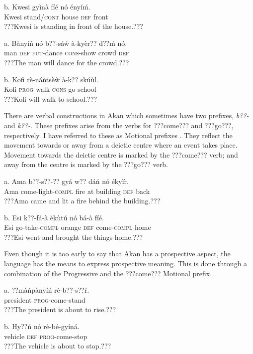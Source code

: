 \documentclass[output=paper]{langsci/langscibook}
\begin{document}
\ea
\gll b.  Kwesi  gyìnà    fíé  nó  ényíḿ.\\
       Kwesi  stand/\textsc{cont}  house  \textsc{def}  front\\
\glt ???Kwesi is standing in front of the house.???
\z

\ea
\gll a.  Bànyíń  nó  b??-sá\'{w}   à-kyèr??    d??ḿ  nó.\\
       man  \textsc{def}  \textsc{fut}{}-dance  \textsc{cons}{}-show  crowd  \textsc{def}\\
\glt   ???The man will dance for the crowd.???
\z

\ea
\gll   b.  Kofi  rè-náńtsèẁ  à-k??    skú\`{u}l.\\
       Kofi  \textsc{prog}{}-walk  \textsc{cons}{}-go  school\\
\glt   ???Kofi will walk to school.???
\z

There are verbal constructions in Akan which sometimes have two prefixes, \emph{b??-} and \emph{k??-}. These prefixes arise from the verbs for ???come??? and ???go???, respectively. I have referred to these as Motional prefixes \citep{Osam2002}. They reflect the movement towards or away from a deictic centre where an event takes place. Movement towards the deictic centre is marked by the ???come??? verb; and away from the centre is marked by the ???go??? verb. 

\ea
\gll a.  Ama  b??-s??-??      gyá  w??  dáń    nó  ékyì\`{r}.\\
       Ama  come-light-\textsc{compl}  fire  at  building  \textsc{def}  back\\
\glt   ???Ama came and lit a fire behind the building.???
\z

\ea
\gll  b.  Esi  k??-fá-à      èk\`{u}tú    nó  bá-à    fíé.\\
       Esi  go-take-\textsc{compl}  orange    \textsc{def}  come-\textsc{compl}  home\\
\glt   ???Esi went and brought the things home.???
\z

Even though it is too early to say that Akan has a prospective aspect, the language has the means to express prospective meaning. This is done through a combination of the Progressive and the ???come??? Motional prefix.

\ea
\gll a.  ??màǹpànyíń  rè-b??-s??\'{r}.\\
       president  \textsc{prog}{}-come-stand\\
\glt   ???The president is about to rise.???
\z

\ea
\gll  b.  Hy??ń    nó  rè-bé-gyíná.\\
       vehicle    \textsc{def}  \textsc{prog}{}-come-stop\\
\glt   ???The vehicle is about to stop.???
\z
\end{document}
